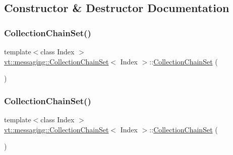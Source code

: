 \subsection{Constructor \& Destructor Documentation}
\mbox{\label{classvt_1_1messaging_1_1_collection_chain_set_aeb43ad4a2e46ea059817b639b72ddb3b}} 
\subsubsection{\texorpdfstring{Collection\+Chain\+Set()}{CollectionChainSet()}\hspace{0.1cm}{\footnotesize\ttfamily [1/3]}}
{\footnotesize\ttfamily template$<$class Index $>$ \\
\hyperlink{classvt_1_1messaging_1_1_collection_chain_set}{vt\+::messaging\+::\+Collection\+Chain\+Set}$<$ Index $>$\+::\hyperlink{classvt_1_1messaging_1_1_collection_chain_set}{Collection\+Chain\+Set} (\begin{DoxyParamCaption}{ }\end{DoxyParamCaption})\hspace{0.3cm}{\ttfamily [default]}}

\mbox{\label{classvt_1_1messaging_1_1_collection_chain_set_a71328cb5c03210ffdb0bd5dd5f3b6797}} 
\subsubsection{\texorpdfstring{Collection\+Chain\+Set()}{CollectionChainSet()}\hspace{0.1cm}{\footnotesize\ttfamily [2/3]}}
{\footnotesize\ttfamily template$<$class Index $>$ \\
\hyperlink{classvt_1_1messaging_1_1_collection_chain_set}{vt\+::messaging\+::\+Collection\+Chain\+Set}$<$ Index $>$\+::\hyperlink{classvt_1_1messaging_1_1_collection_chain_set}{Collection\+Chain\+Set} (\begin{DoxyParamCaption}\item[{const \hyperlink{classvt_1_1messaging_1_1_collection_chain_set}{Collection\+Chain\+Set}$<$ Index $>$ \&}]{ }\end{DoxyParamCaption})\hspace{0.3cm}{\ttfamily [delete]}}

